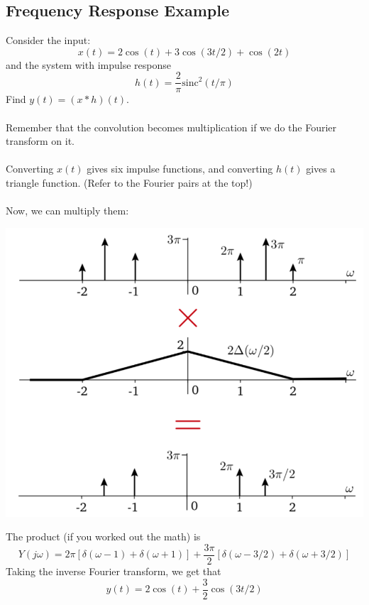 \documentclass[10pt]{article}
\newcommand{\sinc}{\text{sinc}}
\begin{document}
\subsection*{Frequency Response Example}
Consider the input:
\[x(t) = 2\cos(t) + 3\cos(3t/2) + \cos(2t)\]
and the system with impulse response
\[h(t) = \frac{2}{\pi} \sinc^2(t/\pi)\]
Find $y(t) = (x * h)(t)$.\\\\
Remember that the convolution becomes multiplication if we do the Fourier transform on it.\\\\
Converting $x(t)$ gives six impulse functions, and converting $h(t)$ gives a triangle function.  (Refer to the Fourier pairs at the top!)\\\\
Now, we can multiply them:
\begin{center}
    \includegraphics[scale=0.6]{W7_2.png}
\end{center}
The product (if you worked out the math) is 
\[Y(j\omega) = 2\pi[\delta(\omega - 1) + \delta(\omega + 1)] + \frac{3\pi}{2} [\delta(\omega - 3/2) + \delta(\omega + 3/2)]\]
Taking the inverse Fourier transform, we get that
\[y(t) = 2\cos(t) + \frac{3}{2} \cos(3t/2)\]
\end{document}
